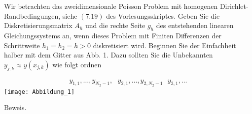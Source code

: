 \begin{exercise}
  Wir betrachten das zweidimensionale Poisson Problem mit homogenen
  Dirichlet-Randbedingungen, siehe $(7.19)$ des Vorlesungsskriptes. Geben Sie
  die Diskretisierungsmatrix $A_h$ und die rechte Seite $g_h$ des entstehenden
  linearen Gleichungssystems an, wenn dieses Problem mit Finiten Differenzen der
  Schrittweite $h_1 = h_2 = h > 0$ diskretisiert wird. Beginnen Sie der Einfachheit
  halber mit dem Gitter aus Abb. 1. Dazu sollten Sie die Unbekannten
  $y_{j,k} \approx y(x_{j,k})$ wie folgt ordnen

  \begin{align}\label{sec}
    y_{1,1}, \dots , y_{N_2 -1}, \text{ }
    y_{2,1}, \dots , y_{2,N_2 -1} \text{ }
    y_{3,1}, \dots
  \end{align}
  \texttt{[image: Abbildung\_1]}
  \end{exercise}

\begin{solution}
  Beweis.
\end{solution}

